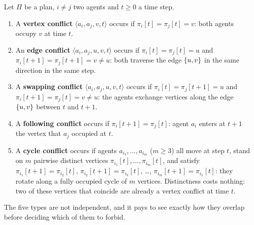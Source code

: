 \begin{definition}
\label{def:ch07-conflicts}
Let $\Pi$ be a plan, $i \ne j$ two agents and $t \ge 0$ a time step.
\begin{enumerate}[label=(\alph*)]
  \item A \textbf{vertex conflict} $\langle a_i, a_j, v, t \rangle$
    occurs if $\pi_i[t] = \pi_j[t] = v$: both agents occupy $v$ at time $t$.
  \item An \textbf{edge conflict} $\langle a_i, a_j, u, v, t \rangle$
    occurs if $\pi_i[t] = \pi_j[t] = u$ and $\pi_i[t+1] = \pi_j[t+1] = v \ne u$:
    both traverse the edge $\left\{ u,v \right\}$ in the same direction in the same step.
  \item A \textbf{swapping conflict} $\langle a_i, a_j, u, v, t \rangle$
    occurs if $\pi_i[t] = \pi_j[t+1] = u$ and $\pi_i[t+1] = \pi_j[t] = v \ne u$:
    the agents exchange vertices along the edge $\left\{ u,v \right\}$ between $t$ and $t+1$.
  \item A \textbf{following conflict} occurs if
    $\pi_i[t+1] = \pi_j[t]$: agent $a_i$ enters at $t+1$ the vertex that $a_j$
    occupied at $t$.
  \item A \textbf{cycle conflict} occurs if agents
    $a_{i_1}, \dots, a_{i_m}$ ($m \ge 3$) all move at step $t$, stand on $m$
    pairwise distinct vertices $\pi_{i_1}[t], \dots, \pi_{i_m}[t]$, and satisfy
    $\pi_{i_1}[t+1] = \pi_{i_2}[t]$, $\pi_{i_2}[t+1] = \pi_{i_3}[t]$, \dots,
    $\pi_{i_m}[t+1] = \pi_{i_1}[t]$: they rotate along a fully occupied cycle
    of $m$ vertices. Distinctness costs nothing: two of these vertices that
    coincide are already a vertex conflict at time $t$.
\end{enumerate}
\end{definition}

The five types are not independent, and it pays to see exactly how they
overlap before deciding which of them to forbid.

